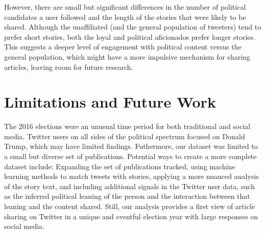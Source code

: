 \documentclass[letterpaper]{article}
\begin{document}
However, there are small but significant differences in the number of political candidates a user followed and the length of the stories that were likely to be shared. Although the unaffiliated (and the general population of tweeters) tend to prefer short stories, both the loyal and political aficionados prefer longer stories. This suggests a deeper level of engagement with political content versus the general population, which might have a more impulsive mechanism for sharing articles, leaving room for future research.

\section{Limitations and Future Work}  
The 2016 elections were an unusual time period for both traditional and social media. Twitter users on all sides of the political spectrum focused on Donald Trump, which may have limited findings. Futhermore, our dataset was limited to a small but diverse set of publications. Potential ways to create a more complete dataset include: Expanding the set of publications tracked, using machine learning methods to match tweets with stories, applying a more nuanced analysis of the story text, and including additional signals in the Twitter user data, such as the inferred political leaning of the person and the interaction between that leaning and the content shared. Still, our analysis provides a first view of article sharing on Twitter in a unique and eventful election year with large responses on social media.


 
 
\end{document}
